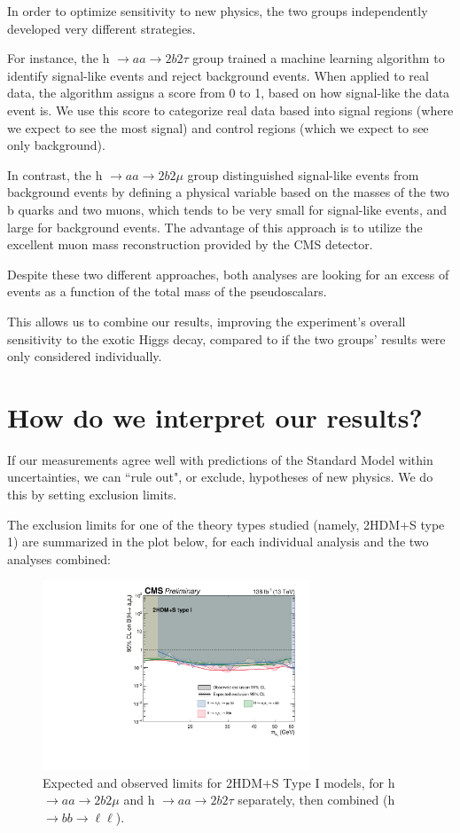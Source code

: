\documentclass{article}
\begin{document}
In order to optimize sensitivity to new physics, the two groups independently developed very different strategies.

For instance, the h $\rightarrow aa \rightarrow 2b 2\tau$ group trained a machine learning algorithm to identify signal-like events and reject background events. When applied to real data, the algorithm assigns a score from 0 to 1, 
based on how signal-like the data event is. We use this score to categorize real data based into signal regions (where we expect to see the most signal) and control regions (which we expect to see only background). 

In contrast, the h $\rightarrow aa \rightarrow 2b 2\mu$ group distinguished signal-like events from background events by defining a physical variable based on the masses of the two b quarks and two muons, which tends to be very small for signal-like events,
and large for background events. The advantage of this approach is to utilize the excellent muon mass reconstruction provided by the CMS detector. 

Despite these two different approaches, both analyses are looking for an excess of events as a function of the total mass of the pseudoscalars. 

This allows us to combine our results, improving the experiment's overall sensitivity to the exotic Higgs decay, compared to if the two groups' results were only considered individually. 

\section{How do we interpret our results?}

If our measurements agree well with predictions of the Standard Model within uncertainties, we can ``rule out", or exclude, hypotheses of new physics. We do this by setting exclusion limits.

The exclusion limits for one of the theory types studied (namely, 2HDM+S type 1) are summarized in the plot below, for each individual analysis and the two analyses combined: 


    \begin{figure}[h]
        \centering
        \includegraphics[width=8cm]{full_run2_plot_BRaa_Type1.pdf}
        \caption{Expected and observed limits for 2HDM+S Type I models, for h $\rightarrow aa \rightarrow 2b2\mu$ and h $\rightarrow aa \rightarrow 2b2\tau$ separately, then combined (h $\rightarrow bb \rightarrow \ell\ell$).}
    \end{figure}
\end{document}
